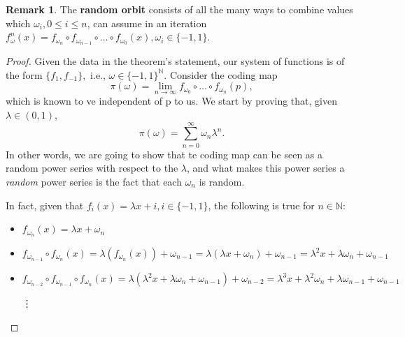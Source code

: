 \documentclass[a4paper]{article}
\theoremstyle{plain}
\theoremstyle{definition}
\newtheorem{rem}[theorem]{Remark}
\begin{document}
\begin{rem}
  The \textbf{random orbit} consists of all the many ways to combine values which \(\omega_{i}, 0\leq i\leq n\), 
can assume in an iteration \(f_{\omega }^{n}(x) = f_{\omega_{n}}\circ{f_{\omega_{n-1}}}\circ{\dotsc}\circ{f_{\omega_{0}}}(x),
 \omega_{i}\in\{-1, 1\}\). 
\end{rem}
\begin{proof}
  Given the data in the theorem's statement, our system of functions is of the form \(\{f_{1}, f_{-1}\},\) i.e., \(\omega\in\{-1, 1\}^{\mathbb{N}}\).
Consider the coding map 
  \[
    \pi(\omega ) = \lim_{n\to \infty}f_{\omega_{0}}\circ{\dotsc}\circ{f_{\omega_{n}}(p)},
  \]
which is known to ve independent of p to us. We start by proving that, given \(\lambda\in (0, 1)\), 
  \[
    \pi (\omega ) = \sum\limits_{n=0}^{\infty}\omega_{n}\lambda ^{n}.
  \]
  In other words, we are going to show that te coding map can be seen as a random power series with respect to the \(\lambda \), and
what makes this power series a \textit{random} power series is the fact that each \(\omega_{n}\) is random.

  In fact, given that \(f_{i}(x) = \lambda x + i, i\in \{-1, 1\}\), the following is true for \(n\in \mathbb{N}\):
\begin{itemize}
  \item \(f_{\omega_{n}}(x) = \lambda x + \omega_{n}\)
  \item \(f_{\omega_{n-1}}\circ{f_{\omega_{n}}}(x) = \lambda(f_{\omega_{n}}(x)) + \omega_{n-1} = \lambda(\lambda x + \omega_{n}) + \omega_{n-1} = \lambda^{2}x + \lambda\omega_{n} + \omega_{n-1}\)
  \item \(f_{\omega_{n-2}}\circ{f_{\omega_{n-1}}}\circ{f_{\omega_{n}}}(x) = \lambda(\lambda^{2} x + \lambda\omega_{n} + \omega_{n-1}) + \omega_{n-2} = \lambda^{3}x + \lambda^{2}\omega_{n} + \lambda\omega_{n-1} + \omega_{n-1}\)

  \quad\vdots


\end{itemize}
\end{proof}
\end{document}

